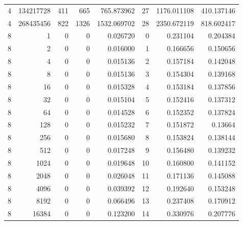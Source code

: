 \begin{longtable}[c]{@{}rrrrrrrr@{}}
    4         & 134217728 & 411       & 665      & 765.873962  & 27                  & 1176.011108 & 410.137146 \\
    4         & 268435456 & 822       & 1326     & 1532.069702 & 28                  & 2350.672119 & 818.602417 \\
    8         & 1         & 0         & 0        & 0.026720    & 0                   & 0.231104    & 0.204384   \\
    8         & 2         & 0         & 0        & 0.016000    & 1                   & 0.166656    & 0.150656   \\
    8         & 4         & 0         & 0        & 0.015136    & 2                   & 0.157184    & 0.142048   \\
    8         & 8         & 0         & 0        & 0.015136    & 3                   & 0.154304    & 0.139168   \\
    8         & 16        & 0         & 0        & 0.015328    & 4                   & 0.153184    & 0.137856   \\
    8         & 32        & 0         & 0        & 0.015104    & 5                   & 0.152416    & 0.137312   \\
    8         & 64        & 0         & 0        & 0.014528    & 6                   & 0.152352    & 0.137824   \\
    8         & 128       & 0         & 0        & 0.015232    & 7                   & 0.151872    & 0.13664    \\
    8         & 256       & 0         & 0        & 0.015680    & 8                   & 0.153824    & 0.138144   \\
    8         & 512       & 0         & 0        & 0.017248    & 9                   & 0.156480    & 0.139232   \\
    8         & 1024      & 0         & 0        & 0.019648    & 10                  & 0.160800    & 0.141152   \\
    8         & 2048      & 0         & 0        & 0.026048    & 11                  & 0.171136    & 0.145088   \\
    8         & 4096      & 0         & 0        & 0.039392    & 12                  & 0.192640    & 0.153248   \\
    8         & 8192      & 0         & 0        & 0.066496    & 13                  & 0.237408    & 0.170912   \\
    8         & 16384     & 0         & 0        & 0.123200    & 14                  & 0.330976    & 0.207776   \\

\end{longtable}
